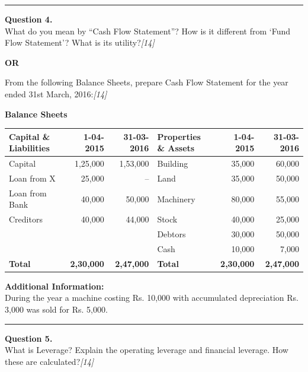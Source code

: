 \documentclass[11pt,a4paper]{article}
\newcommand{\pts}[1]{\hfill   \textit{[#1]}}
\begin{document}
\medskip\rule{\linewidth}{0.2pt}




\noindent   \textbf{Question 4.} \\
What do you mean by ``Cash Flow Statement''? How is it different from `Fund Flow Statement'? What is its utility?\pts{14}

\centerline{   \textbf{OR}}

From the following Balance Sheets, prepare Cash Flow Statement for the year ended 31st March, 2016:\pts{14}


\begin{center}
\small
   \textbf{Balance Sheets} \\[4pt]
\renewcommand{\arraystretch}{1.2}

\begin{tabular}{|l|r|r|l|r|r|}
\hline
   \textbf{Capital \& Liabilities} &   \textbf{1-04-2015} &   \textbf{31-03-2016} &   \textbf{Properties \& Assets} &   \textbf{1-04-2015} &   \textbf{31-03-2016} \\ \hline
Capital & 1,25,000 & 1,53,000 & Building & 35,000 & 60,000 \\
Loan from X & 25,000 & -- & Land & 35,000 & 50,000 \\
Loan from Bank & 40,000 & 50,000 & Machinery & 80,000 & 55,000 \\
Creditors & 40,000 & 44,000 & Stock & 40,000 & 25,000 \\
& & & Debtors & 30,000 & 50,000 \\
& & & Cash & 10,000 & 7,000 \\ \hline
   \textbf{Total} &   \textbf{2,30,000} &   \textbf{2,47,000} &   \textbf{Total} &   \textbf{2,30,000} &   \textbf{2,47,000} \\ \hline
\end{tabular}
\end{center}




\noindent   \textbf{Additional Information:} \\
During the year a machine costing Rs. 10,000 with accumulated depreciation Rs. 3,000 was sold for Rs. 5,000.

\medskip\rule{\linewidth}{0.2pt}

\pagebreak




\noindent   \textbf{Question 5.} \\
What is Leverage? Explain the operating leverage and financial leverage. How these are calculated?\pts{14}
\end{document}
